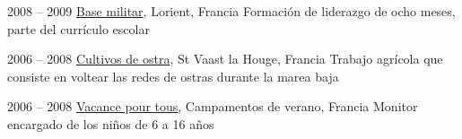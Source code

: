 
\item[Commandos Marine]{2008 -- 2009}
	{
	\href{http://www.defense.gouv.fr/marine/organisation/forces/fusiliers-marins-et-commandos/force-maritime-des-fusiliers-marins-et-commandos}{Base militar}, Lorient, Francia
	}
	{Formación de liderazgo de ocho meses, parte del currículo escolar}

\item[Ostrícultor]{2006 -- 2008}
	{
	\href{http://huitresdesaintvaast.fr/}{Cultivos de ostra}, St Vaast la Houge, Francia
	}
	{Trabajo agrícola que consiste en voltear las redes de ostras durante la marea baja}


\item[Animador]{2006 -- 2008}
	{
	\href{http://www.vacances-pour-tous.org/}{Vacance pour tous}, Campamentos de verano, Francia
	}
	{Monitor encargado de los niños de 6 a 16 años}
	

